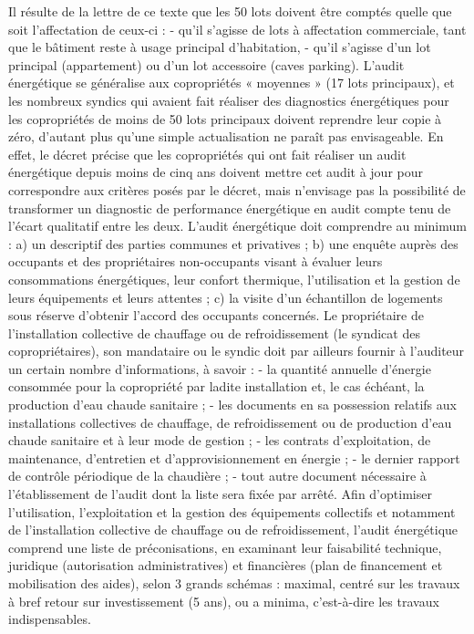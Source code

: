 		Il résulte de la lettre de ce texte que les 50 lots doivent être comptés quelle que soit l'affectation de ceux-ci :
		- qu'il s'agisse de lots à affectation commerciale, tant que le bâtiment reste à usage principal d'habitation,
		- qu'il s'agisse d'un lot principal (appartement) ou d'un lot accessoire (caves parking).
		L'audit énergétique se généralise aux copropriétés « moyennes » (17 lots principaux), et les nombreux syndics qui avaient fait réaliser des diagnostics énergétiques pour les copropriétés de moins de 50 lots principaux doivent reprendre leur copie à zéro, d'autant plus qu'une simple actualisation ne paraît pas envisageable.
		En effet, le décret précise que les copropriétés qui ont fait réaliser un audit énergétique depuis moins de cinq ans doivent mettre cet audit à jour pour correspondre aux critères posés par le décret, mais n'envisage pas la possibilité de transformer un diagnostic de performance énergétique en audit compte tenu de l'écart qualitatif entre les deux.
		L’audit énergétique doit comprendre au minimum :
		a) un descriptif des parties communes et privatives ;
		b) une enquête auprès des occupants et des propriétaires non-occupants visant à évaluer leurs consommations énergétiques, leur confort thermique, l’utilisation et la gestion de leurs équipements et leurs attentes ;
		c) la visite d’un échantillon de logements sous réserve d’obtenir l’accord des occupants concernés.
		Le propriétaire de l’installation collective de chauffage ou de refroidissement (le syndicat des copropriétaires), son mandataire ou le syndic doit par ailleurs fournir à l’auditeur un certain nombre d’informations, à savoir :
		- la quantité annuelle d’énergie consommée pour la copropriété par ladite installation et, le cas échéant, la production d’eau chaude sanitaire ;
		- les documents en sa possession relatifs aux installations collectives de chauffage, de refroidissement ou de production d’eau chaude sanitaire et à leur mode de gestion ;
		- les contrats d’exploitation, de maintenance, d’entretien et d’approvisionnement en énergie ;
		- le dernier rapport de contrôle périodique de la chaudière ;
		- tout autre document nécessaire à l’établissement de l’audit dont la liste sera fixée par arrêté.
		Afin d’optimiser l’utilisation, l’exploitation et la gestion des équipements collectifs et notamment de l’installation collective de chauffage ou de refroidissement, l’audit énergétique comprend une liste de préconisations, en examinant leur faisabilité technique, juridique (autorisation administratives) et financières (plan de financement et mobilisation des aides), selon 3 grands schémas : maximal, centré sur les travaux à bref retour sur investissement (5 ans), ou a minima, c’est-à-dire les travaux indispensables.
		
